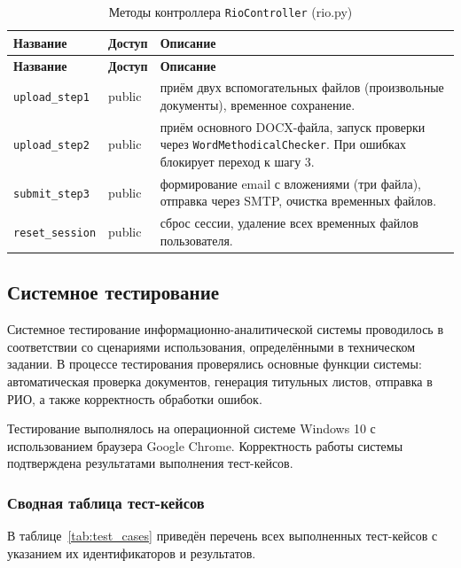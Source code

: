 \begin{xltabular}{\textwidth}{|p{5cm}|p{1.8cm}|X|}
	\caption{Методы контроллера \texttt{RioController} (rio.py)\label{tab:rio_controller}}\\
	\hline
	\textbf{Название} & \textbf{Доступ} & \textbf{Описание} \\
	\hline
	\endfirsthead
	
	\hline
	\textbf{Название} & \textbf{Доступ} & \textbf{Описание} \\
	\hline
	\endhead
	
	\hline
	\endfoot
	
	\texttt{upload\_step1} & public & приём двух вспомогательных файлов (произвольные документы), временное сохранение. \\ \hline
	\texttt{upload\_step2} & public & приём основного DOCX-файла, запуск проверки через \texttt{WordMethodicalChecker}. При ошибках блокирует переход к шагу 3. \\ \hline
	\texttt{submit\_step3} & public & формирование email с вложениями (три файла), отправка через SMTP, очистка временных файлов. \\ \hline
	\texttt{reset\_session} & public & сброс сессии, удаление всех временных файлов пользователя. \\ \hline
\end{xltabular}


\subsection{Системное тестирование}

Системное тестирование информационно-аналитической системы проводилось в соответствии со сценариями использования, определёнными в техническом задании. В процессе тестирования проверялись основные функции системы: автоматическая проверка документов, генерация титульных листов, отправка в РИО, а также корректность обработки ошибок.

Тестирование выполнялось на операционной системе Windows 10 с использованием браузера Google Chrome. Корректность работы системы подтверждена результатами выполнения тест-кейсов.

\subsubsection{Сводная таблица тест-кейсов}

В таблице~\ref{tab:test_cases} приведён перечень всех выполненных тест-кейсов с указанием их идентификаторов и результатов.

